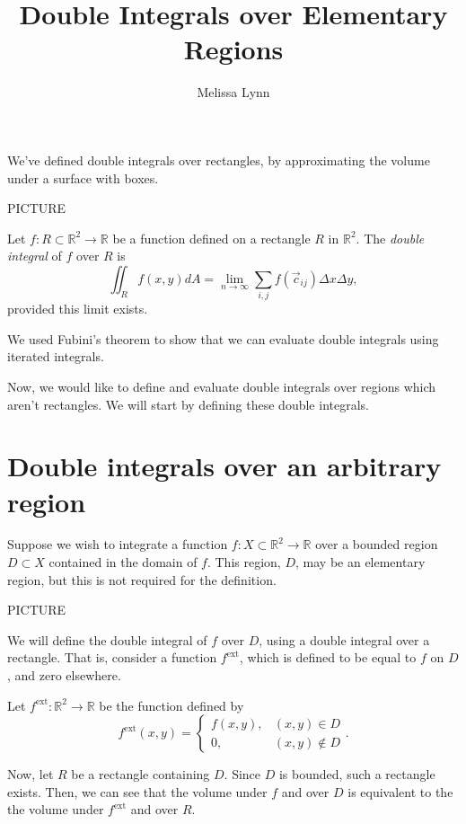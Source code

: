 \documentclass{ximera}
\title{Double Integrals over Elementary Regions}
\author{Melissa Lynn}
\begin{document}
  
\begin{abstract}  
\end{abstract}  
\maketitle  

We've defined double integrals over rectangles, by approximating the volume under a surface with boxes.

PICTURE

\begin{definition}
Let $f:R\subset\mathbb{R}^2\rightarrow\mathbb{R}$ be a function defined on a rectangle $R$ in $\mathbb{R}^2$. The \emph{double integral} of $f$ over $R$ is
\[
\iint_R f(x,y) dA = \lim_{n\rightarrow \infty} \sum_{i,j} f(\vec{c}_{ij})\Delta x\Delta y,
\]
provided this limit exists.
\end{definition}

We used Fubini's theorem to show that we can evaluate double integrals using iterated integrals.

Now, we would like to define and evaluate double integrals over regions which aren't rectangles. We will start by defining these double integrals.

\section*{Double integrals over an arbitrary region}

Suppose we wish to integrate a function $f:X\subset\mathbb{R}^2\rightarrow\mathbb{R}$ over a bounded region $D\subset X$ contained in the domain of $f$. This region, $D$, may be an elementary region, but this is not required for the definition.

PICTURE

We will define the double integral of $f$ over $D$, using a double integral over a rectangle. That is, consider a function $f^{\text{ext}}$, which is defined to be equal to $f$ on $D$, and zero elsewhere.

\begin{definition}
Let $f^{\text{ext}}:\mathbb{R}^2\rightarrow\mathbb{R}$ be the function defined by
\[
f^{\text{ext}}(x,y) = \begin{cases}
f(x,y), & (x,y)\in D\\
0, & (x,y)\notin D
\end{cases}.
\]
\end{definition}

Now, let $R$ be a rectangle containing $D$. Since $D$ is bounded, such a rectangle exists. Then, we can see that the volume under $f$ and over $D$ is equivalent to the the volume under $f^{\text{ext}}$ and over $R$.
\end{document}
